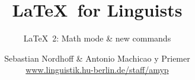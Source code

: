 


\title{
	\LaTeX\ for Linguists
}

\subtitle{\LaTeX\ 2: Math mode \& new commands}

\author[aMyP]{
	{\small Sebastian Nordhoff \& Antonio Machicao y Priemer}
	\\
	{\footnotesize \url{www.linguistik.hu-berlin.de/staff/amyp}}
}








\begin{frame}
  \HUtitle
\end{frame}





\nocite{Freitag&MyP15a}
\nocite{Knuth1986}
\nocite{Kopka94a}
	


%
%
%
%
%


